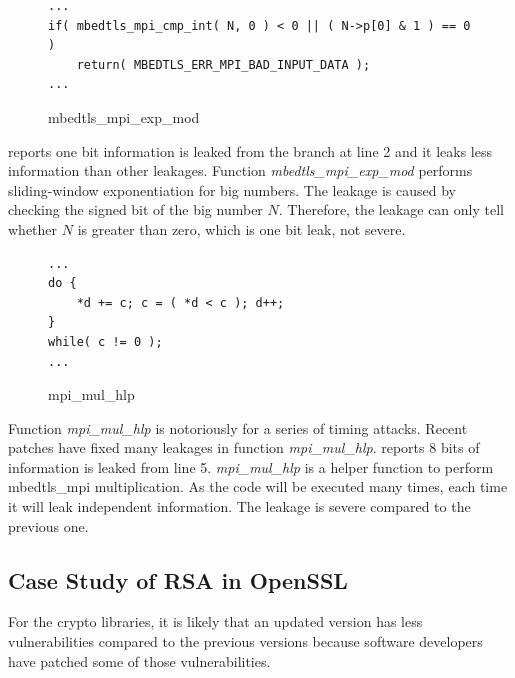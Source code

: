 \begin{figure}[h!]
    \centering
\begin{lstlisting}[xleftmargin=.02\textwidth,xrightmargin=.01\textwidth]
...
if( mbedtls_mpi_cmp_int( N, 0 ) < 0 || ( N->p[0] & 1 ) == 0 )
    return( MBEDTLS_ERR_MPI_BAD_INPUT_DATA );
...
\end{lstlisting}
\caption{mbedtls\_mpi\_exp\_mod}
\label{mbedtls_rsa_1}
\end{figure}

\tool{} reports one bit information is leaked from the branch at line 2 and
it leaks less information than other leakages.
Function \emph{mbedtls\_mpi\_exp\_mod} performs sliding-window exponentiation for
big numbers. 
The leakage is caused by checking the signed bit of the big number $N$. 
Therefore, the leakage can only tell whether $N$ is greater than zero, which is one
bit leak, not severe.


\begin{figure}[h!]
    \centering
\begin{lstlisting}[xleftmargin=.02\textwidth,xrightmargin=.01\textwidth]
...
do {
    *d += c; c = ( *d < c ); d++;
}
while( c != 0 );
...
\end{lstlisting}
\caption{mpi\_mul\_hlp}
\label{mbedtls_rsa_2}
\end{figure}

Function \emph{mpi\_mul\_hlp} is notoriously for a series of timing attacks. Recent 
patches have fixed many leakages in function \emph{mpi\_mul\_hlp}.
\tool{} reports 8 bits of information is leaked from line 5. 
\emph{mpi\_mul\_hlp} is a helper function to perform
mbedtls\_mpi multiplication. As the code will be executed many times,
each time it will leak independent information. The leakage is severe 
compared to the previous one.

\subsection{Case Study of RSA in OpenSSL}
For the crypto libraries, it is likely that an updated version has less vulnerabilities
compared to the previous versions because software developers have patched some
of those vulnerabilities.  

